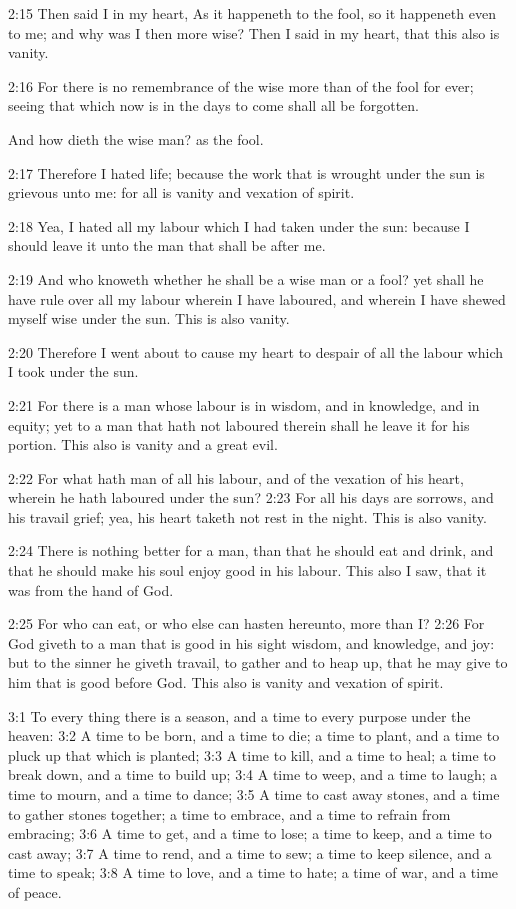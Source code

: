 2:15 Then said I in my heart, As it happeneth to the fool, so it happeneth even to me; and why was I then more wise? Then I said in my heart, that this also is vanity.

2:16 For there is no remembrance of the wise more than of the fool for ever; seeing that which now is in the days to come shall all be forgotten.

And how dieth the wise man? as the fool.

2:17 Therefore I hated life; because the work that is wrought under the sun is grievous unto me: for all is vanity and vexation of spirit.

2:18 Yea, I hated all my labour which I had taken under the sun: because I should leave it unto the man that shall be after me.

2:19 And who knoweth whether he shall be a wise man or a fool? yet shall he have rule over all my labour wherein I have laboured, and wherein I have shewed myself wise under the sun. This is also vanity.

2:20 Therefore I went about to cause my heart to despair of all the labour which I took under the sun.

2:21 For there is a man whose labour is in wisdom, and in knowledge, and in equity; yet to a man that hath not laboured therein shall he leave it for his portion. This also is vanity and a great evil.

2:22 For what hath man of all his labour, and of the vexation of his heart, wherein he hath laboured under the sun?  2:23 For all his days are sorrows, and his travail grief; yea, his heart taketh not rest in the night. This is also vanity.

2:24 There is nothing better for a man, than that he should eat and drink, and that he should make his soul enjoy good in his labour. This also I saw, that it was from the hand of God.

2:25 For who can eat, or who else can hasten hereunto, more than I?  2:26 For God giveth to a man that is good in his sight wisdom, and knowledge, and joy: but to the sinner he giveth travail, to gather and to heap up, that he may give to him that is good before God. This also is vanity and vexation of spirit.

3:1 To every thing there is a season, and a time to every purpose under the heaven: 3:2 A time to be born, and a time to die; a time to plant, and a time to pluck up that which is planted; 3:3 A time to kill, and a time to heal; a time to break down, and a time to build up; 3:4 A time to weep, and a time to laugh; a time to mourn, and a time to dance; 3:5 A time to cast away stones, and a time to gather stones together; a time to embrace, and a time to refrain from embracing; 3:6 A time to get, and a time to lose; a time to keep, and a time to cast away; 3:7 A time to rend, and a time to sew; a time to keep silence, and a time to speak; 3:8 A time to love, and a time to hate; a time of war, and a time of peace.

